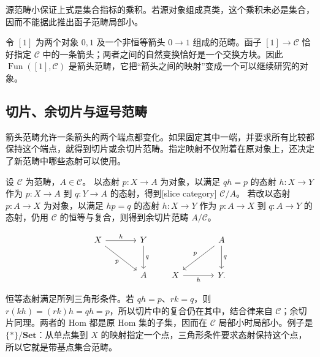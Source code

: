 源范畴小保证上式是集合指标的乘积。若源对象组成真类，这个乘积未必是集合，因而不能据此推出函子范畴局部小。

\ProseParagraphBreak
令 \([1]\) 为两个对象 \(0,1\) 及一个非恒等箭头 \(0\rightarrow1\) 组成的范畴。函子 \([1]\rightarrow\mathcal C\) 恰好指定 \(\mathcal C\) 中的一条箭头；两者之间的自然变换恰好是一个交换方块。因此 \(\operatorname{Fun}([1],\mathcal C)\) 是箭头范畴，它把“箭头之间的映射”变成一个可以继续研究的对象。

\subsection{切片、余切片与逗号范畴}
\label{b4:subsec:slice-coslice-comma-categories}
\label{b4:subsec:0103:03}

箭头范畴允许一条箭头的两个端点都变化。如果固定其中一端，并要求所有比较都保持这个端点，就得到切片或余切片范畴。指定映射不仅附着在原对象上，还决定了新范畴中哪些态射可以使用。

\begin{definition}\label{b4:def:slice-coslice-category}
	设 \(\mathcal C\) 为范畴，\(A\in\mathcal C\)。 以态射 \(p:X\rightarrow A\) 为对象，以满足 \(qh=p\) 的态射 \(h:X\rightarrow Y\) 作为 \(p:X\rightarrow A\) 到 \(q:Y\rightarrow A\) 的态射，得到[slice category] \(\mathcal C/A\)。 若改以态射 \(p:A\rightarrow X\) 为对象，以满足 \(hp=q\) 的态射 \(h:X\rightarrow Y\) 作为 \(p:A\rightarrow X\) 到 \(q:A\rightarrow Y\) 的态射，仍用 \(\mathcal C\) 的恒等与复合，则得到余切片范畴 \(A/\mathcal C\)。
\end{definition}

\[
	\begin{tikzcd}[column sep=large,row sep=large]
		X\arrow[r,"h"]\arrow[dr,"p"']&Y\arrow[d,"q"]\\
		&A
	\end{tikzcd}
	\qquad
	\begin{tikzcd}[column sep=large,row sep=large]
		&A\arrow[dl,"p"']\arrow[d,"q"]\\
		X\arrow[r,"h"']&Y.
	\end{tikzcd}
\]

恒等态射满足所列三角形条件。若 \(qh=p\)、\(rk=q\)，则 \(r(kh)=(rk)h=qh=p\)，所以切片中的复合仍在其中，结合律来自 \(\mathcal C\)；余切片同理。两者的 Hom 都是原 Hom 集的子集，因而在 \(\mathcal C\) 局部小时局部小。例子是 \(\{*\}/\mathbf{Set}\)：从单点集到 \(X\) 的映射指定一个点，三角形条件要求态射保持这个点，所以它就是带基点集合范畴。

